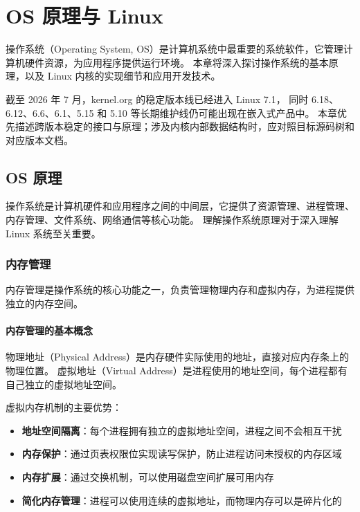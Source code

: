 \chapter{OS 原理与 Linux}

操作系统（Operating System, OS）是计算机系统中最重要的系统软件，它管理计算机硬件资源，为应用程序提供运行环境。
本章将深入探讨操作系统的基本原理，以及 Linux 内核的实现细节和应用开发技术。

截至 2026 年 7 月，kernel.org 的稳定版本线已经进入 Linux 7.1，
同时 6.18、6.12、6.6、6.1、5.15 和 5.10 等长期维护线仍可能出现在嵌入式产品中。
本章优先描述跨版本稳定的接口与原理；涉及内核内部数据结构时，应对照目标源码树和对应版本文档。

\section{OS 原理}

操作系统是计算机硬件和应用程序之间的中间层，它提供了资源管理、进程管理、内存管理、文件系统、网络通信等核心功能。
理解操作系统原理对于深入理解 Linux 系统至关重要。

\subsection{内存管理}

内存管理是操作系统的核心功能之一，负责管理物理内存和虚拟内存，为进程提供独立的内存空间。

\subsubsection{内存管理的基本概念}


物理地址（Physical Address）是内存硬件实际使用的地址，直接对应内存条上的物理位置。
虚拟地址（Virtual Address）是进程使用的地址空间，每个进程都有自己独立的虚拟地址空间。

虚拟内存机制的主要优势：
\begin{itemize}
  \item \textbf{地址空间隔离}：每个进程拥有独立的虚拟地址空间，进程之间不会相互干扰
  \item \textbf{内存保护}：通过页表权限位实现读写保护，防止进程访问未授权的内存区域
  \item \textbf{内存扩展}：通过交换机制，可以使用磁盘空间扩展可用内存
  \item \textbf{简化内存管理}：进程可以使用连续的虚拟地址，而物理内存可以是碎片化的
\end{itemize}


